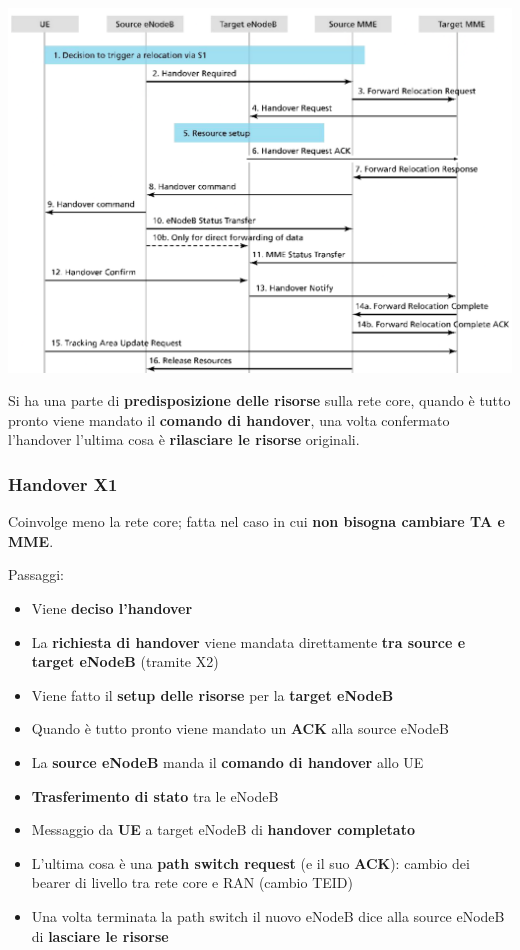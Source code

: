 \begin{center}
	\includegraphics[width=0.98\linewidth]{img/4g/hand1}
\end{center}

Si ha una parte di \textbf{predisposizione delle risorse} sulla rete core, quando è tutto pronto viene mandato il \textbf{comando di handover}, una volta confermato l'handover l'ultima cosa è \textbf{rilasciare le risorse} originali.

\subsubsection{Handover X1}

Coinvolge meno la rete core; fatta nel caso in cui \textbf{non bisogna cambiare TA e MME}. 

Passaggi: 
\begin{itemize}
	\item Viene \textbf{deciso l'handover}

	\item La \textbf{richiesta di handover} viene mandata direttamente \textbf{tra source e target eNodeB} (tramite X2)

	\item Viene fatto il \textbf{setup delle risorse} per la \textbf{target eNodeB}

	\item Quando è tutto pronto viene mandato un \textbf{ACK} alla source eNodeB

	\item La \textbf{source eNodeB} manda il \textbf{comando di handover} allo UE

	\item \textbf{Trasferimento di stato} tra le eNodeB

	\item Messaggio da \textbf{UE} a target eNodeB di \textbf{handover completato}

	\item L'ultima cosa è una \textbf{path switch request} (e il suo \textbf{ACK}): cambio dei bearer di livello tra rete core e RAN (cambio TEID)

	\item Una volta terminata la path switch il nuovo eNodeB dice alla source eNodeB di \textbf{lasciare le risorse}
\end{itemize}

